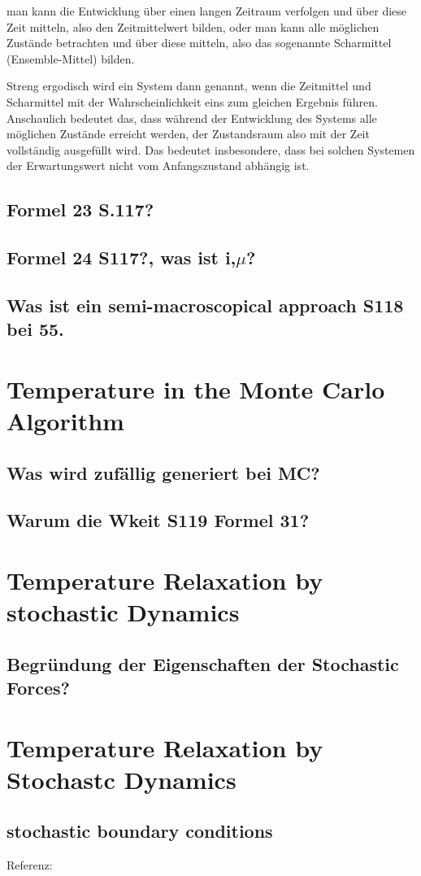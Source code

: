 \documentclass[]{article}
\begin{document}
man kann die Entwicklung über einen langen Zeitraum verfolgen und über diese Zeit mitteln, also den Zeitmittelwert bilden, oder
man kann alle möglichen Zustände betrachten und über diese mitteln, also das sogenannte Scharmittel (Ensemble-Mittel) bilden.

Streng ergodisch wird ein System dann genannt, wenn die Zeitmittel und Scharmittel mit der Wahrscheinlichkeit eins zum gleichen Ergebnis führen. Anschaulich bedeutet das, dass während der Entwicklung des Systems alle möglichen Zustände erreicht werden, der Zustandsraum also mit der Zeit vollständig ausgefüllt wird. Das bedeutet insbesondere, dass bei solchen Systemen der Erwartungswert nicht vom Anfangszustand abhängig ist.

\subsection{Formel 23 S.117?}

\subsection{Formel 24 S117?, was ist i,$\mu$?}

\subsection{Was ist ein semi-macroscopical approach S118 bei 55.}

\section{Temperature in the Monte Carlo Algorithm}

\subsection{Was wird zufällig generiert bei MC?}

\subsection{Warum die Wkeit S119 Formel 31?}

\section{Temperature Relaxation by stochastic Dynamics}

\subsection{Begründung der Eigenschaften der Stochastic Forces?}

\section{Temperature Relaxation by Stochastc Dynamics}

\subsection{stochastic boundary conditions}
Referenz: %
\end{document}
